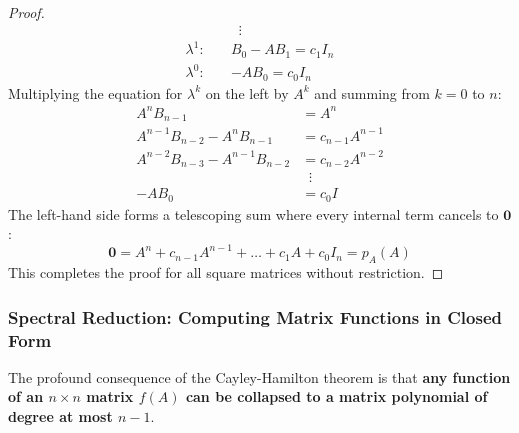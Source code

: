 \begin{proof}
\begin{align*}
&\;\;\vdots \\
\lambda^1: \quad & B_0 - A B_1 = c_1 I_n \\
\lambda^0: \quad & -A B_0 = c_0 I_n
\end{align*}
Multiplying the equation for $\lambda^k$ on the left by $A^k$ and summing from $k = 0$ to $n$:
\begin{align*}
A^n B_{n-1} &= A^n \\
A^{n-1} B_{n-2} - A^n B_{n-1} &= c_{n-1} A^{n-1} \\
A^{n-2} B_{n-3} - A^{n-1} B_{n-2} &= c_{n-2} A^{n-2} \\
&\;\;\vdots \\
-A B_0 &= c_0 I
\end{align*}
The left-hand side forms a telescoping sum where every internal term cancels to $\mathbf{0}$:
\begin{equation}
\mathbf{0} = A^n + c_{n-1} A^{n-1} + \dots + c_1 A + c_0 I_n = p_A(A)
\end{equation}
This completes the proof for all square matrices without restriction.
\end{proof}

\subsubsection{Spectral Reduction: Computing Matrix Functions in Closed Form}
The profound consequence of the Cayley-Hamilton theorem is that \textbf{any function of an $n \times n$ matrix $f(A)$ can be collapsed to a matrix polynomial of degree at most $n - 1$}.

